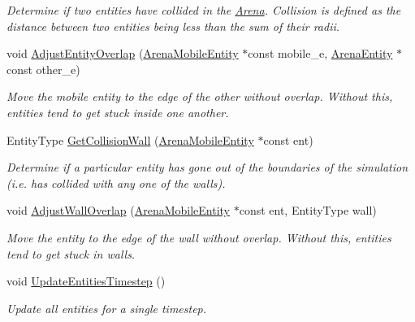\begin{DoxyCompactItemize}
\begin{DoxyCompactList}\small\item\em Determine if two entities have collided in the \mbox{\hyperlink{class_arena}{Arena}}. Collision is defined as the distance between two entities being less than the sum of their radii. \end{DoxyCompactList}\item 
\mbox{\label{class_arena_a2506fab770b6070d8f061bcab4c65138}} 
void \mbox{\hyperlink{class_arena_a2506fab770b6070d8f061bcab4c65138}{Adjust\+Entity\+Overlap}} (\mbox{\hyperlink{class_arena_mobile_entity}{Arena\+Mobile\+Entity}} $\ast$const mobile\+\_\+e, \mbox{\hyperlink{class_arena_entity}{Arena\+Entity}} $\ast$const other\+\_\+e)
\begin{DoxyCompactList}\small\item\em Move the mobile entity to the edge of the other without overlap. Without this, entities tend to get stuck inside one another. \end{DoxyCompactList}\item 
Entity\+Type \mbox{\hyperlink{class_arena_a7b72cf7688ee6ab1395bf438663bc1da}{Get\+Collision\+Wall}} (\mbox{\hyperlink{class_arena_mobile_entity}{Arena\+Mobile\+Entity}} $\ast$const ent)
\begin{DoxyCompactList}\small\item\em Determine if a particular entity has gone out of the boundaries of the simulation (i.\+e. has collided with any one of the walls). \end{DoxyCompactList}\item 
\mbox{\label{class_arena_a51c1e99dfd9a618c6041fd22d0a11959}} 
void \mbox{\hyperlink{class_arena_a51c1e99dfd9a618c6041fd22d0a11959}{Adjust\+Wall\+Overlap}} (\mbox{\hyperlink{class_arena_mobile_entity}{Arena\+Mobile\+Entity}} $\ast$const ent, Entity\+Type wall)
\begin{DoxyCompactList}\small\item\em Move the entity to the edge of the wall without overlap. Without this, entities tend to get stuck in walls. \end{DoxyCompactList}\item 
void \mbox{\hyperlink{class_arena_a682ec81cb30e36e5bb801b3388bcb494}{Update\+Entities\+Timestep}} ()
\begin{DoxyCompactList}\small\item\em Update all entities for a single timestep. \end{DoxyCompactList}\item 

\end{DoxyCompactItemize}
